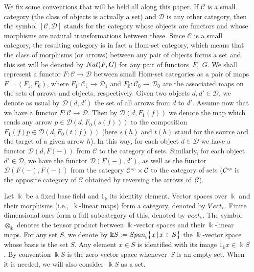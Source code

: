 \documentclass[11pt]{article}
\numberwithin{equation}{section}
\newcommand{\tensor}[1]{\otimes_{\scriptscriptstyle{#1}}}
\newcommand{\Vect}{{\rm Vect}_{\Sscript{\Bbbk}}}
\newcommand{\vect}{{\rm vect}_{\Sscript{\Bbbk}}}
\newcommand{\Co}{\mathcal{C}_{\Sscript{0}}}
\newcommand{\Ca}{\mathcal{C}_{\Sscript{1}}}
\newcommand{\Do}{\cD_{\Sscript{0}}}
\newcommand{\Da}{\cD_{\Sscript{1}}}
\newcommand{\Fo}{F_{\Sscript{0}}}
\newcommand{\Fa}{F_{\Sscript{1}}}
\newcommand{\cD}{{\mathcal D}}
\newcommand{\Sscript}[1]{\scriptscriptstyle{#1}}
\begin{document}
We fix some conventions that will be held all along this paper. If $\mathcal{C}$ is a small category (the class of objects is actually a set) and $\cD$ is any other category, then the symbol $[\mathcal{C}, \cD]$ stands for the category whose objects are functors and whose morphisms are natural transformations between these. Since $\mathcal{C}$ is a small category, the resulting category is in fact a Hom-set category, which means that the class of morphisms (or arrows) between any pair of objects forms a set and this set will be denoted by ${\rm Nat}(F,G)$ for any pair of functors~$F$,~$G$. We shall represent a functor $F \colon \mathcal{C} \to \cD$ between small Hom-set categories as a pair of maps $F=(\Fa,\Fo)$, where $\Fa\colon \Ca \to \Da$ and $\Fo\colon \Co \to \Do$ are the associated maps on the sets of arrows and objects, respectively. Given two objects $d,d' \in \cD$, we denote as usual by $\cD(d,d')$ the set of all arrows from $d$ to $d'$. Assume now that we have a functor $F\colon \mathcal{C} \to \cD$. Then by $\cD(d,\Fa(f))$ we denote the map which sends any arrow $p \in \cD(d, F_{\Sscript{0}}(s(f)))$ to the composition $\Fa(f)p \in \cD(d,F_{\Sscript{0}}(t(f)))$ (here $s(h)$ and $t(h)$ stand for the source and the target of a given arrow $h$). In this way, for each object $d \in \cD$ we have a functor $\cD(d,F(-))$ from $\mathcal{C}$ to the category of sets. Similarly, for each object $d' \in \cD$, we have the functor $\cD(F(-), d')$, as well as the functor $\cD(F(-), F(-))$ from the category $\mathcal{C}^{\Sscript{\rm op}} \times \mathcal{C}$ to the category of sets ($\mathcal{C}^{\Sscript{\rm op}}$ is the opposite category of $\mathcal{C}$ obtained by reversing the arrows of~$\mathcal{C}$).

Let $\Bbbk$ be a fixed base field and $1_{\Sscript{\Bbbk}}$ its identity element. Vector spaces over $\Bbbk$ and their morphisms (i.e.,~$\Bbbk$-linear maps) form a category, denoted by $\Vect$. Finite dimensional ones form a full subcategory of this, denoted by $\vect$. The symbol $\tensor{\Bbbk}$ denotes the tensor product between $\Bbbk$-vector spaces and their $\Bbbk$-linear maps. For any set $S$, we denote by $\Bbbk S:={\rm Span}_{\Sscript{\Bbbk}}\big\{x \,|\, x \in S \big\}$ the $\Bbbk$-vector space whose basis is the set $S$. Any element $x \in S$ is identified with its image $1_{\Sscript{\Bbbk}} x \in \Bbbk S$. By convention $\Bbbk S$ is the zero vector space whenever~$S$ is an empty set. When it is needed, we will also consider~$\Bbbk S$ as a set.
\end{document}
